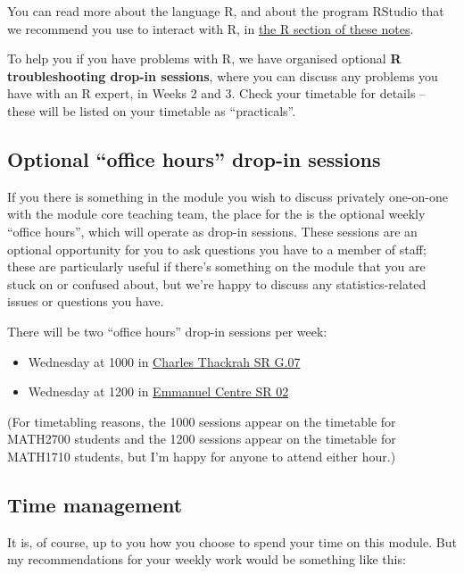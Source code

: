 \documentclass[
  a4paper,
]{book}
\providecommand{\tightlist}{%
  \setlength{\itemsep}{0pt}\setlength{\parskip}{0pt}}
\theoremstyle{definition}
\theoremstyle{definition}
\theoremstyle{definition}
\theoremstyle{definition}
\theoremstyle{remark}
\begin{document}
You can read more about the language R, and about the program RStudio that we recommend you use to interact with R, in \protect\hyperlink{R}{the R section of these notes}.

To help you if you have problems with R, we have organised optional \textbf{R troubleshooting drop-in sessions}, where you can discuss any problems you have with an R expert, in Weeks 2 and 3. Check your timetable for details -- these will be listed on your timetable as ``practicals''.

\hypertarget{dropin}{%
\subsection*{Optional ``office hours'' drop-in sessions}\label{dropin}}

If you there is something in the module you wish to discuss privately one-on-one with the module core teaching team, the place for the is the optional weekly ``office hours'', which will operate as drop-in sessions. These sessions are an optional opportunity for you to ask questions you have to a member of staff; these are particularly useful if there's something on the module that you are stuck on or confused about, but we're happy to discuss any statistics-related issues or questions you have.

There will be two ``office hours'' drop-in sessions per week:

\begin{itemize}
\tightlist
\item
  Wednesday at 1000 in \href{https://ses.leeds.ac.uk/rooms?type=room\&id=1207583}{Charles Thackrah SR G.07}
\item
  Wednesday at 1200 in \href{https://students.leeds.ac.uk/rooms?type=room\&id=99930}{Emmanuel Centre SR 02}
\end{itemize}

(For timetabling reasons, the 1000 sessions appear on the timetable for MATH2700 students and the 1200 sessions appear on the timetable for MATH1710 students, but I'm happy for anyone to attend either hour.)

\hypertarget{time}{%
\subsection*{Time management}\label{time}}

It is, of course, up to you how you choose to spend your time on this module. But my recommendations for your weekly work would be something like this:
\end{document}
